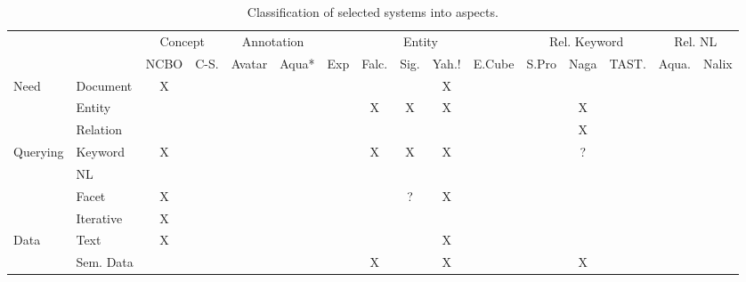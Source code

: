 \begin{table}[htbp]
  \centering
  \caption{Classification of selected systems into aspects.}
    \begin{tabular}{rrcccccccccccccc}
    \multicolumn{1}{c}{} & \multicolumn{1}{c}{} & \multicolumn{2}{c}{Concept} & \multicolumn{2}{c}{Annotation} & \multicolumn{5}{c}{Entity}            & \multicolumn{3}{c}{Rel. Keyword} & \multicolumn{2}{c}{Rel. NL} & \\
    \multicolumn{1}{c}{} & \multicolumn{1}{c}{} & NCBO  & C-S.  & Avatar & Aqua* & Exp   & Falc. & Sig.  & Yah.! & E.Cube & S.Pro & Naga  & TAST. & Aqua. & Nalix \\
    \multicolumn{1}{l}{\multirow{3}[0]{*}{Need}} & \multicolumn{1}{l}{Document} & X     &       &       &       &       &       &       & X     &       &       &       &       &       &  \\
    \multicolumn{1}{l}{} & \multicolumn{1}{l}{Entity} &       &       &       &       &       & X     & X     & X     &       &       & X     &       &       &  \\
    \multicolumn{1}{l}{} & \multicolumn{1}{l}{Relation} &       &       &       &       &       &       &       &       &       &       & X     &       &       &  \\
    \multicolumn{1}{l}{\multirow{4}[0]{*}{Querying}} & \multicolumn{1}{l}{Keyword} & X     &       &       &       &       & X     & X     & X     &       &       & ?     &       &       &  \\
    \multicolumn{1}{l}{} & \multicolumn{1}{l}{NL} &       &       &       &       &       &       &       &       &       &       &       &       &       &  \\
    \multicolumn{1}{l}{} & \multicolumn{1}{l}{Facet} & X     &       &       &       &       &       & ?     & X     &       &       &       &       &       &  \\
    \multicolumn{1}{l}{} & \multicolumn{1}{l}{Iterative} & X     &       &       &       &       &       &       &       &       &       &       &       &       &  \\
    \multicolumn{1}{l}{\multirow{3}[0]{*}{Data}} & \multicolumn{1}{l}{Text} & X     &       &       &       &       &       &       & X     &       &       &       &       &       &  \\
    \multicolumn{1}{l}{} & \multicolumn{1}{l}{Sem. Data} &       &       &       &       &       & X     &       & X     &       &       & X     &       &       &  \\

\end{tabular}
\end{table}
